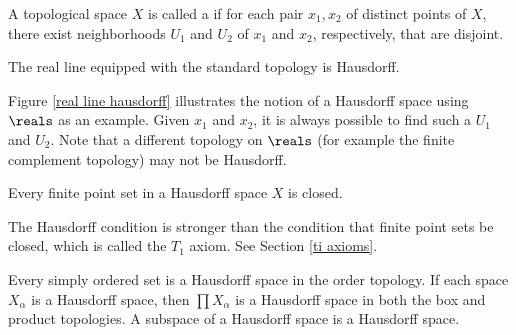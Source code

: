\begin{definition}
	A topological space $X$ is called a  if for each pair $x_1, x_2$ 
	of distinct points of $X$, there exist neighborhoods $U_1$ 
	and $U_2$ of $x_1$ and $x_2$, respectively, that are disjoint.
\end{definition}

\begin{marginfigure}
	\centering
	\caption{The real line equipped with the standard topology is 
	Hausdorff.}\label{real line hausdorff}
\end{marginfigure}

Figure \ref{real line hausdorff} illustrates the notion of a 
Hausdorff space using $\reals$ as an example. Given $x_1$ and 
$x_2$, it is always possible to find such a $U_1$ and $U_2$. Note 
that a different topology on $\reals$ (for example the finite 
complement topology) may not be Hausdorff.

\begin{theorem}
	Every finite point set in a Hausdorff space $X$ is closed.
\end{theorem}

The Hausdorff condition is stronger than the condition that 
finite point sets be closed, which is called the $T_1$ axiom. See 
Section \ref{ti axioms}.

\begin{theorem}
	Every simply ordered set is a Hausdorff space in the order 
	topology. If each space $X_\alpha$ is a Hausdorff space, then 
	$\prod X_\alpha$ is a Hausdorff space in both the box and 
	product topologies. A subspace of a Hausdorff space is a 
	Hausdorff space.
\end{theorem}



